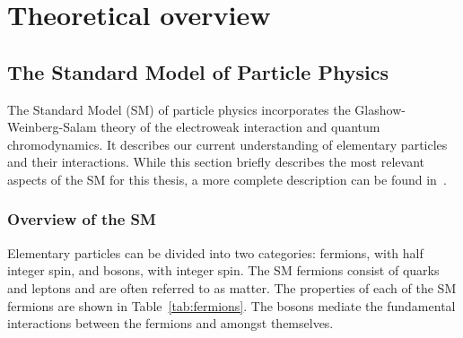 \section{Theoretical overview}
\label{sec:theory}

\subsection{The Standard Model of Particle Physics}

The Standard Model (SM) of particle physics incorporates the Glashow-Weinberg-Salam theory of the electroweak interaction and quantum chromodynamics. It describes our current understanding of elementary particles and their interactions. While this section briefly describes the most relevant aspects of the SM for this thesis, a more complete description can be found in~\cite{griffiths,halzen}.

\subsubsection{Overview of the SM}

Elementary particles can be divided into two categories: fermions, with half integer spin, and bosons, with integer spin. The SM fermions consist of quarks and leptons and are often referred to as matter. The properties of each of the SM fermions are shown in Table~\ref{tab:fermions}. The bosons mediate the fundamental interactions between the fermions and amongst themselves. 

